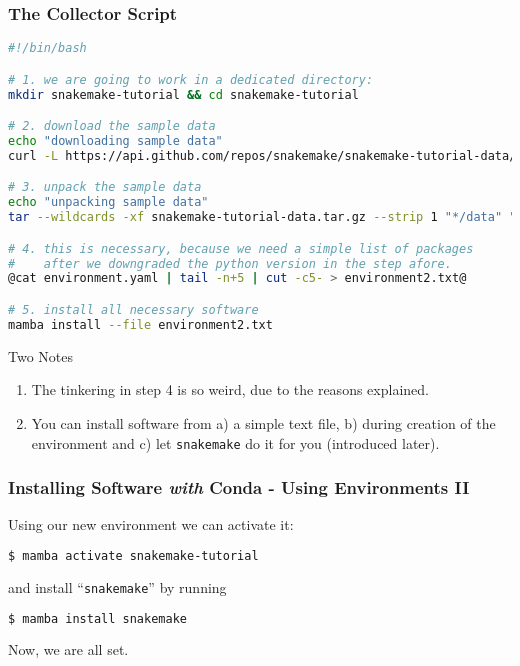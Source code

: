 \begin{frame}[fragile]
  \frametitle{The Collector Script}
  \begin{lstlisting}[language=Bash, style=Shell, basicstyle=\tiny]
#!/bin/bash

# 1. we are going to work in a dedicated directory:
mkdir snakemake-tutorial && cd snakemake-tutorial

# 2. download the sample data
echo "downloading sample data"
curl -L https://api.github.com/repos/snakemake/snakemake-tutorial-data/tarball -o snakemake-tutorial-data.tar.gz

# 3. unpack the sample data
echo "unpacking sample data"
tar --wildcards -xf snakemake-tutorial-data.tar.gz --strip 1 "*/data" "*/environment.yaml"

# 4. this is necessary, because we need a simple list of packages
#    after we downgraded the python version in the step afore.
@cat environment.yaml | tail -n+5 | cut -c5- > environment2.txt@

# 5. install all necessary software
mamba install --file environment2.txt
  \end{lstlisting}
  \begin{block}{Two Notes}
    \begin{enumerate}
     \item The tinkering in step 4 is so weird, due to the reasons explained.
     \item You can install software from a) a simple text file, b) during creation of the environment and c) let \texttt{snakemake} do it for you (introduced later).
    \end{enumerate}
  \end{block}
\end{frame}

\begin{frame}[fragile]
  \frametitle{Installing Software \emph{with} Conda - Using Environments II}
  Using our new environment we can activate it:
  \begin{lstlisting}[language=Bash, style=Shell]
$ mamba activate snakemake-tutorial
  \end{lstlisting}
  and install ``\texttt{snakemake}'' by running
  \begin{lstlisting}[language=Bash, style=Shell]
$ mamba install snakemake
  \end{lstlisting}
  Now, we are all set. 
\end{frame}


